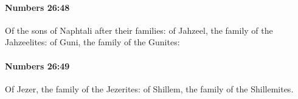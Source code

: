 		\paragraph{Numbers 26:48} %
			\label{NUMBERS-26-48}

			Of the sons of Naphtali after their families: of Jahzeel, the family of the Jahzeelites: of Guni, the family of the Gunites:


		\paragraph{Numbers 26:49} %
			\label{NUMBERS-26-49}

			Of Jezer, the family of the Jezerites: of Shillem, the family of the Shillemites.


